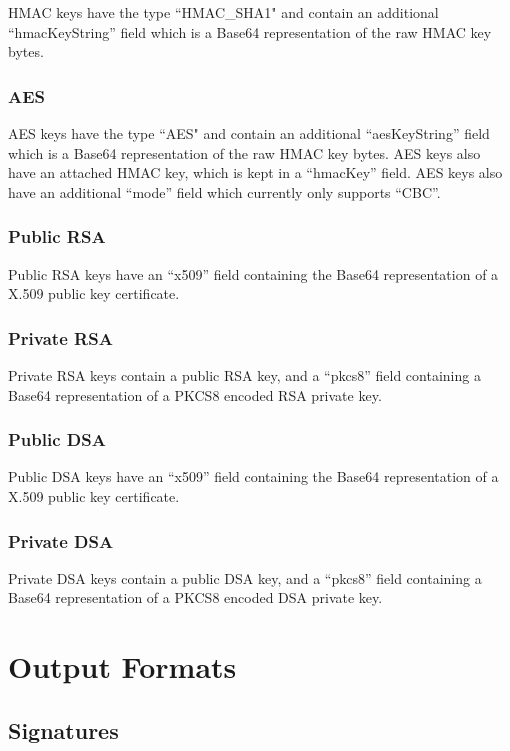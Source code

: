 \documentclass{llncs}
\begin{document}
HMAC keys have the type ``HMAC\_SHA1" and contain an additional
``hmacKeyString'' field which is a Base64 representation of the raw HMAC key
bytes. 

\subsubsection{AES}

AES keys have the type ``AES" and contain an additional
``aesKeyString'' field which is a Base64 representation of the raw HMAC key bytes. AES keys also have an attached HMAC
key, which is kept in a ``hmacKey'' field. AES keys also have an additional
``mode'' field which currently only supports ``CBC''.

\subsubsection{Public RSA}

Public RSA keys have an ``x509'' field containing the Base64 representation of
a X.509 public key certificate. 

\subsubsection{Private RSA}

Private RSA keys contain a public RSA key, and a ``pkcs8'' field containing a
Base64 representation of a PKCS8 encoded RSA private key. 

\subsubsection{Public DSA}

Public DSA keys have an ``x509'' field containing the Base64 representation of
a X.509 public key certificate. 

\subsubsection{Private DSA}

Private DSA keys contain a public DSA key, and a ``pkcs8'' field containing a
Base64 representation of a PKCS8 encoded DSA private key. 

\section{Output Formats}

\subsection{Signatures}
\end{document}
